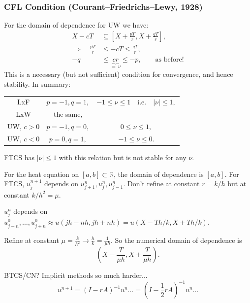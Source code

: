\documentclass[12pt, a4paper]{article}
\theoremstyle{definition}
\theoremstyle{remark}
\numberwithin{equation}{section}
\begin{document}
\subsubsection{CFL Condition (Courant--Friedrichs--Lewy, 1928)}
For the domain of dependence for UW we have:
\begin{align*}
X - cT &\subseteq [X + \tfrac{pT}{r}, X + \tfrac{qT}{r}] ,\\
\Longrightarrow \quad \tfrac{pT}{r} & \le -cT \le \tfrac{qT}{r}, \\
-q & \le \underbrace{cr}_{=\ \nu} \le -p, \qquad \text{as before!}
\end{align*}
This is a necessary (but not sufficient)
condition for convergence, and hence stability. In summary:
\begin{center} \begin{tabular}{ccc}
LxF & $p=-1, q=1,$ & $-1 \le \nu \le 1 \quad \text{i.e.} \quad |\nu| \le 1,$ \\
LxW & the same, \\
UW, $c>0$ & $p = -1, q=0,$ & $0 \le \nu \le 1,$ \\
UW, $c<0$ & $p = 0, q=1,$ & $-1 \le \nu \le 0.$
\end{tabular}\end{center}
FTCS has $|\nu| \le 1$ with this relation
but is not stable for any $\nu$.

For the heat equation on $[a,b]\subset\mathbb{R}$, the domain of
dependence is $[a,b]$. For FTCS, $u_j^{n+1}$ depends on
$u_{j+1}^n, u_j^n, u_{j-1}^n$. Don't refine at constant $r=k/h$ but
at constant $k/h^2=\mu$.

$u_j^n$ depends on $u_{j-n}^0, \ldots, u_{j+n}^0 \approx u(jh-nh, jh+nh) = u(X-Th/k, X+Th/k)$.

Refine at constant $\mu = \frac{k}{h^2} \rightarrow \frac{h}{k} = \frac{1}{\mu h}$.
 So the numerical domain of dependence is
 $$\left(X - \frac{T}{\mu h}, X + \frac{T}{\mu h}\right).$$

BTCS/CN? Implicit methods so much harder... 
$$u^{n+1} = (I - r A)^{-1}u^n \ldots = \left(I-\frac{1}{2} r A\right)^{-1}u^n \ldots$$
\end{document}
